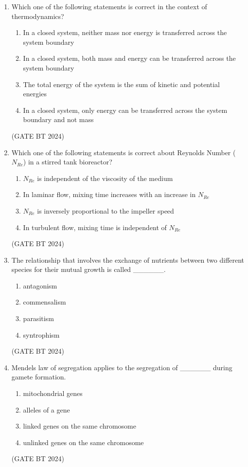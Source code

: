 \documentclass[journal,12pt,onecolumn]{IEEEtran}
\theoremstyle{remark}
\begin{document}
\begin{enumerate}
\item 
Which one of the following statements is correct in the context of thermodynamics?

\begin{enumerate}
    \item In a closed system, neither mass nor energy is transferred across the system boundary
    \item In a closed system, both mass and energy can be transferred across the system boundary
    \item The total energy of the system is the sum of kinetic and potential energies
    \item In a closed system, only energy can be transferred across the system boundary and not mass
\end{enumerate}
\hfill(GATE BT 2024)

\item 
Which one of the following statements is correct about Reynolds Number ($N_{Re}$) in a stirred tank bioreactor?

\begin{enumerate}
    \item $N_{Re}$ is independent of the viscosity of the medium
    \item In laminar flow, mixing time increases with an increase in $N_{Re}$
    \item $N_{Re}$ is inversely proportional to the impeller speed
    \item In turbulent flow, mixing time is independent of $N_{Re}$
\end{enumerate}
\hfill(GATE BT 2024)

\item 
The relationship that involves the exchange of nutrients between two different species for their mutual growth is called \_\_\_\_\_\_.
\begin{multicols}{2}
\begin{enumerate}
    \item antagonism
    \item commensalism
    \item parasitism
    \item syntrophism
\end{enumerate}
\end{multicols}
\hfill(GATE BT 2024)

\item 
Mendels law of segregation applies to the segregation of \_\_\_\_\_\_ during gamete formation.
\begin{multicols}{2}
\begin{enumerate}
    \item mitochondrial genes
    \item alleles of a gene
    \item linked genes on the same chromosome
    \item unlinked genes on the same chromosome
\end{enumerate}
\end{multicols}
\hfill(GATE BT 2024)


\end{enumerate}
\end{document}
